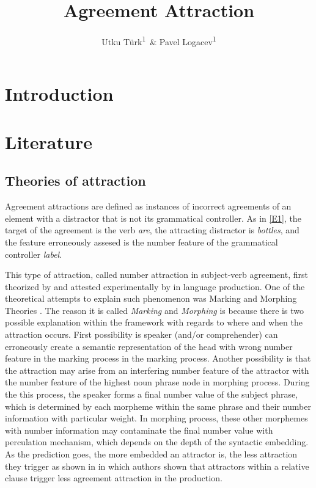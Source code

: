 \documentclass[doc]{apa6}
\title{Agreement Attraction}
\author{Utku Türk\textsuperscript{1}~\& Pavel Logacev\textsuperscript{1}}
\date{}
\affiliation{
\vspace{0.5cm}
\textsuperscript{1} Boğaziçi University}
\begin{document}
\maketitle

\hypertarget{introduction}{%
\section{Introduction}\label{introduction}}

\hypertarget{literature}{%
\section{Literature}\label{literature}}

\hypertarget{theories-of-attraction}{%
\subsection{Theories of attraction}\label{theories-of-attraction}}

Agreement attractions are defined as instances of incorrect agreements of an element with a distractor that is not its grammatical controller. As in \autoref{E1}, the target of the agreement is the verb \emph{are}, the attracting distractor is \emph{bottles}, and the feature erroneously assesed is the number feature of the grammatical controller \emph{label}.

\begin{exe}
\label{E1}
\end{exe}


This type of attraction, called number attraction in subject-verb agreement, first theorized by \textcite{Quirk1972} and attested experimentally by \textcite{Bock1991} in language production. One of the theoretical attempts to explain such phenomenon was Marking and Morphing Theories \autocites{Bock2001}[ among others]{Eberhard2005}. The reason it is called \emph{Marking} and \emph{Morphing} is because there is two possible explanation within the framework with regards to where and when the attraction occurs. First possibility is speaker (and/or comprehender) can erroneously create a semantic representation of the head with wrong number feature in the marking process in the marking process. Another possibility is that the attraction may arise from an interfering number feature of the attractor with the number feature of the highest noun phrase node in morphing process. During the this process, the speaker forms a final number value of the subject phrase, which is determined by each morpheme within the same phrase and their number information with particular weight. In morphing process, these other morphemes with number information may contaminate the final number value with perculation mechanism, which depends on the depth of the syntactic embedding. As the prediction goes, the more embedded an attractor is, the less attraction they trigger as shown in \textcite{Bock1992} in which authors shown that attractors within a relative clause trigger less agreement attraction in the production.
\end{document}
